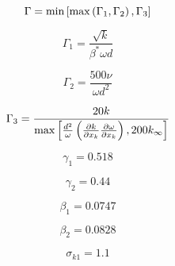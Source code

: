 {\newpage\clearpage
{}%
\begin{displaymath}
\Gamma = {\rm min} \left[ {\rm max} \left( \Gamma_1, \Gamma_2 \right), \Gamma_3 \right]
\end{displaymath}%
\lthtmldisplayZ
\lthtmlcheckvsize\clearpage}

{\newpage\clearpage
{}%
\begin{displaymath}
\Gamma_1 = \frac{\sqrt{k}}{\beta^* \omega d}
\end{displaymath}%
\lthtmldisplayZ
\lthtmlcheckvsize\clearpage}

{\newpage\clearpage
{}%
\begin{displaymath}
\Gamma_2 = \frac{500 \nu}{\omega d^2}
\end{displaymath}%
\lthtmldisplayZ
\lthtmlcheckvsize\clearpage}

{\newpage\clearpage
{}%
\begin{displaymath}
\Gamma_3 = \frac{20 k}{{\rm max} \left[ \frac{d^2}{\omega} \left( 
   \frac{\partial k}{\partial x_k} \frac{\partial \omega}{\partial x_k} 
   \right) , 200 k_{\infty} \right]}
\end{displaymath}%
\lthtmldisplayZ
\lthtmlcheckvsize\clearpage}

{\newpage\clearpage
{}%
\begin{displaymath}
\gamma_1 = 0.518
\end{displaymath}%
\lthtmldisplayZ
\lthtmlcheckvsize\clearpage}

{\newpage\clearpage
{}%
\begin{displaymath}
\gamma_2 = 0.44
\end{displaymath}%
\lthtmldisplayZ
\lthtmlcheckvsize\clearpage}

{\newpage\clearpage
{}%
\begin{displaymath}
\beta_1 = 0.0747
\end{displaymath}%
\lthtmldisplayZ
\lthtmlcheckvsize\clearpage}

{\newpage\clearpage
{}%
\begin{displaymath}
\beta_2 = 0.0828
\end{displaymath}%
\lthtmldisplayZ
\lthtmlcheckvsize\clearpage}

{\newpage\clearpage
{}%
\begin{displaymath}
\sigma_{k1} = 1.1
\end{displaymath}%
\lthtmldisplayZ
\lthtmlcheckvsize\clearpage}

